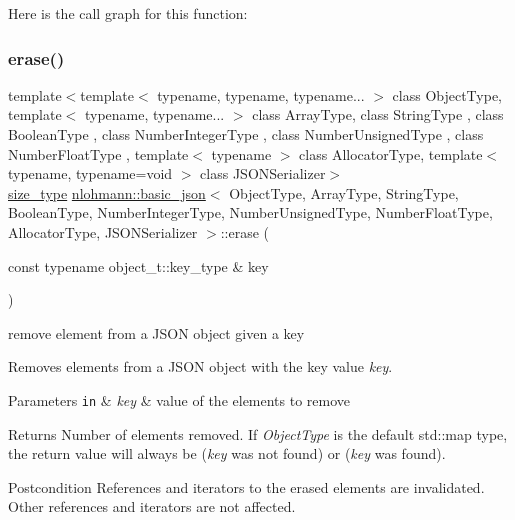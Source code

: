 Here is the call graph for this function\+:
\mbox{\label{classnlohmann_1_1basic__json_a2f8484d69c55d8f2a9697a7bec29362a}} 
\subsubsection{\texorpdfstring{erase()}{erase()}\hspace{0.1cm}{\footnotesize\ttfamily [3/4]}}
{\footnotesize\ttfamily template$<$template$<$ typename, typename, typename... $>$ class Object\+Type, template$<$ typename, typename... $>$ class Array\+Type, class String\+Type , class Boolean\+Type , class Number\+Integer\+Type , class Number\+Unsigned\+Type , class Number\+Float\+Type , template$<$ typename $>$ class Allocator\+Type, template$<$ typename, typename=void $>$ class J\+S\+O\+N\+Serializer$>$ \\
\hyperlink{classnlohmann_1_1basic__json_a39f2cd0b58106097e0e67bf185cc519b}{size\+\_\+type} \hyperlink{classnlohmann_1_1basic__json}{nlohmann\+::basic\+\_\+json}$<$ Object\+Type, Array\+Type, String\+Type, Boolean\+Type, Number\+Integer\+Type, Number\+Unsigned\+Type, Number\+Float\+Type, Allocator\+Type, J\+S\+O\+N\+Serializer $>$\+::erase (\begin{DoxyParamCaption}\item[{const typename object\+\_\+t\+::key\+\_\+type \&}]{key }\end{DoxyParamCaption})\hspace{0.3cm}{\ttfamily [inline]}}



remove element from a J\+S\+ON object given a key 

Removes elements from a J\+S\+ON object with the key value {\itshape key}.


\begin{DoxyParams}[1]{Parameters}
\mbox{\tt in}  & {\em key} & value of the elements to remove\\
\hline
\end{DoxyParams}
\begin{DoxyReturn}{Returns}
Number of elements removed. If {\itshape Object\+Type} is the default {\ttfamily std\+::map} type, the return value will always be {} ({\itshape key} was not found) or {} ({\itshape key} was found).
\end{DoxyReturn}
\begin{DoxyPostcond}{Postcondition}
References and iterators to the erased elements are invalidated. Other references and iterators are not affected.
\end{DoxyPostcond}

